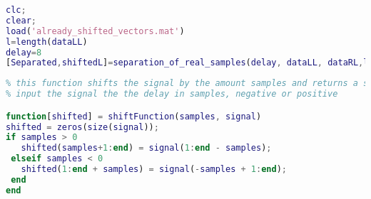 \begin{lstlisting}[language=Matlab, label=lst:realSamplesSeparation]
clc;
clear;
load('already_shifted_vectors.mat')
l=length(dataLL)
delay=8
[Separated,shiftedL]=separation_of_real_samples(delay, dataLL, dataRL,l);
\end{lstlisting}

\begin{lstlisting}[language=Matlab, label=lst:shiftFunction]
%% SHIFT FUNCTION 
% this function shifts the signal by the amount samples and returns a shifted signal
% input the signal the the delay in samples, negative or positive

function[shifted] = shiftFunction(samples, signal)
shifted = zeros(size(signal));
if samples > 0
   shifted(samples+1:end) = signal(1:end - samples);
 elseif samples < 0
   shifted(1:end + samples) = signal(-samples + 1:end);
 end
end
\end{lstlisting}


